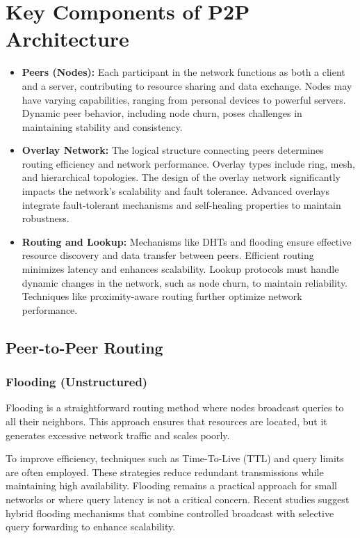 \section{Key Components of P2P Architecture}

\begin{itemize}
    \item \textbf{Peers (Nodes):} Each participant in the network functions as both a client and a server, contributing to resource sharing and data exchange. Nodes may have varying capabilities, ranging from personal devices to powerful servers. Dynamic peer behavior, including node churn, poses challenges in maintaining stability and consistency.
    \item \textbf{Overlay Network:} The logical structure connecting peers determines routing efficiency and network performance. Overlay types include ring, mesh, and hierarchical topologies. The design of the overlay network significantly impacts the network's scalability and fault tolerance. Advanced overlays integrate fault-tolerant mechanisms and self-healing properties to maintain robustness.
    \item \textbf{Routing and Lookup:} Mechanisms like DHTs and flooding ensure effective resource discovery and data transfer between peers. Efficient routing minimizes latency and enhances scalability. Lookup protocols must handle dynamic changes in the network, such as node churn, to maintain reliability. Techniques like proximity-aware routing further optimize network performance.
\end{itemize}

\subsection{Peer-to-Peer Routing}

\subsubsection{Flooding (Unstructured)}
Flooding is a straightforward routing method where nodes broadcast queries to all their neighbors. This approach ensures that resources are located, but it generates excessive network traffic and scales poorly.

To improve efficiency, techniques such as Time-To-Live (TTL) and query limits are often employed. These strategies reduce redundant transmissions while maintaining high availability. Flooding remains a practical approach for small networks or where query latency is not a critical concern. Recent studies suggest hybrid flooding mechanisms that combine controlled broadcast with selective query forwarding to enhance scalability.

